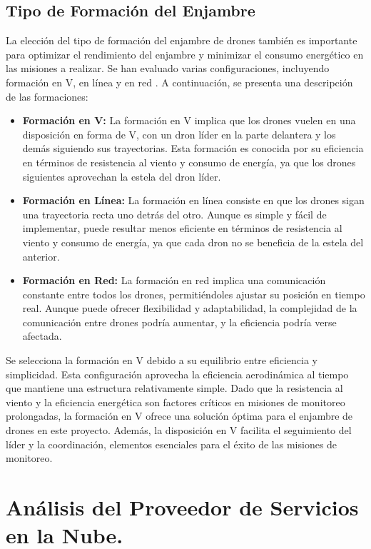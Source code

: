 \subsection{Tipo de Formación del Enjambre}
La elección del tipo de formación del enjambre de drones también es importante para optimizar el rendimiento del enjambre y minimizar el consumo energético en las misiones a realizar. Se han evaluado varias configuraciones, incluyendo formación en V, en línea y en red \cite{formaciones}. A continuación, se presenta una descripción de las formaciones:

\begin{itemize}
\item \textbf{Formación en V:} La formación en V implica que los drones vuelen en una disposición en forma de \textquotedbl{}V\textquotedbl{}, con un dron líder en la parte delantera y los demás siguiendo sus trayectorias. Esta formación es conocida por su eficiencia en términos de resistencia al viento y consumo de energía, ya que los drones siguientes aprovechan la estela del dron líder.
\item \textbf{Formación en Línea:} La formación en línea consiste en que los drones sigan una trayectoria recta uno detrás del otro. Aunque es simple y fácil de implementar, puede resultar menos eficiente en términos de resistencia al viento y consumo de energía, ya que cada dron no se beneficia de la estela del anterior.
\item \textbf{Formación en Red:} La formación en red implica una comunicación constante entre todos los drones, permitiéndoles ajustar su posición en tiempo real. Aunque puede ofrecer flexibilidad y adaptabilidad, la complejidad de la comunicación entre drones podría aumentar, y la eficiencia podría verse afectada.
\end{itemize}
Se selecciona la formación en V debido a su equilibrio entre eficiencia y simplicidad. Esta configuración aprovecha la eficiencia aerodinámica al tiempo que mantiene una estructura relativamente simple. Dado que la resistencia al viento y la eficiencia energética son factores críticos en misiones de monitoreo prolongadas, la formación en V ofrece una solución óptima para el enjambre de drones en este proyecto. Además, la disposición en V facilita el seguimiento del líder y la coordinación, elementos esenciales para el éxito de las misiones de monitoreo.

\newpage
\section{Análisis del Proveedor de Servicios en la Nube.}

